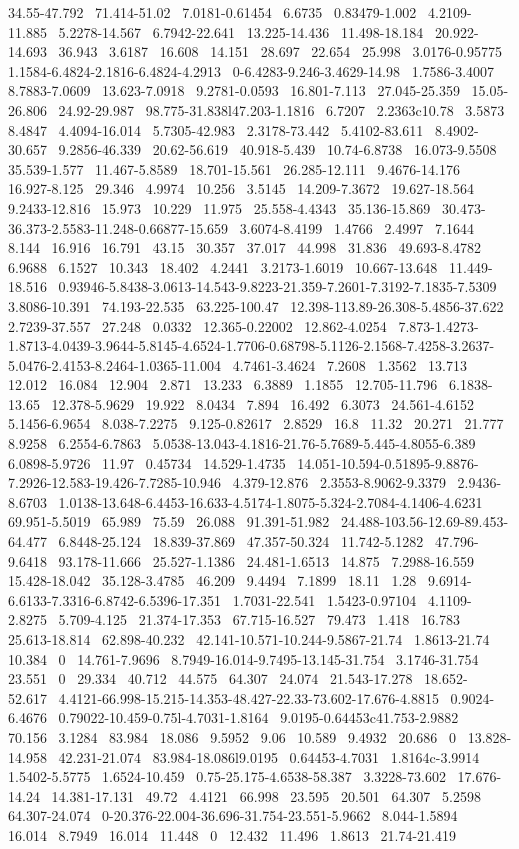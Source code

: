 \documentclass{article}
\begin{document}
34.55-47.792~ 71.414-51.02~ 7.0181-0.61454~ 6.6735~ 0.83479-1.002~ 4.2109-11.885~ 5.2278-14.567~ 6.7942-22.641~ 13.225-14.436~ 11.498-18.184~ 20.922-14.693~ 36.943~ 3.6187~ 16.608~ 14.151~ 28.697~ 22.654~ 25.998~ 3.0176-0.95775~ 1.1584-6.4824-2.1816-6.4824-4.2913~ 0-6.4283-9.246-3.4629-14.98~ 1.7586-3.4007~ 8.7883-7.0609~ 13.623-7.0918~ 9.2781-0.0593~ 16.801-7.113~ 27.045-25.359~ 15.05-26.806~ 24.92-29.987~ 98.775-31.838l47.203-1.1816~ 6.7207~ 2.2363c10.78~ 3.5873~ 8.4847~ 4.4094-16.014~ 5.7305-42.983~ 2.3178-73.442~ 5.4102-83.611~ 8.4902-30.657~ 9.2856-46.339~ 20.62-56.619~ 40.918-5.439~ 10.74-6.8738~ 16.073-9.5508~ 35.539-1.577~ 11.467-5.8589~ 18.701-15.561~ 26.285-12.111~ 9.4676-14.176~ 16.927-8.125~ 29.346~ 4.9974~ 10.256~ 3.5145~ 14.209-7.3672~ 19.627-18.564~ 9.2433-12.816~ 15.973~ 10.229~ 11.975~ 25.558-4.4343~ 35.136-15.869~ 30.473-36.373-2.5583-11.248-0.66877-15.659~ 3.6074-8.4199~ 1.4766~ 2.4997~ 7.1644~ 8.144~ 16.916~ 16.791~ 43.15~ 30.357~ 37.017~ 44.998~ 31.836~ 49.693-8.4782~ 6.9688~ 6.1527~ 10.343~ 18.402~ 4.2441~ 3.2173-1.6019~ 10.667-13.648~ 11.449-18.516~ 0.93946-5.8438-3.0613-14.543-9.8223-21.359-7.2601-7.3192-7.1835-7.5309~ 3.8086-10.391~ 74.193-22.535~ 63.225-100.47~ 12.398-113.89-26.308-5.4856-37.622~ 2.7239-37.557~ 27.248~ 0.0332~ 12.365-0.22002~ 12.862-4.0254~ 7.873-1.4273-1.8713-4.0439-3.9644-5.8145-4.6524-1.7706-0.68798-5.1126-2.1568-7.4258-3.2637-5.0476-2.4153-8.2464-1.0365-11.004~ 4.7461-3.4624~ 7.2608~ 1.3562~ 13.713~ 12.012~ 16.084~ 12.904~ 2.871~ 13.233~ 6.3889~ 1.1855~ 12.705-11.796~ 6.1838-13.65~ 12.378-5.9629~ 19.922~ 8.0434~ 7.894~ 16.492~ 6.3073~ 24.561-4.6152~ 5.1456-6.9654~ 8.038-7.2275~ 9.125-0.82617~ 2.8529~ 16.8~ 11.32~ 20.271~ 21.777~ 8.9258~ 6.2554-6.7863~ 5.0538-13.043-4.1816-21.76-5.7689-5.445-4.8055-6.389~ 6.0898-5.9726~ 11.97~ 0.45734~ 14.529-1.4735~ 14.051-10.594-0.51895-9.8876-7.2926-12.583-19.426-7.7285-10.946~ 4.379-12.876~ 2.3553-8.9062-9.3379~ 2.9436-8.6703~ 1.0138-13.648-6.4453-16.633-4.5174-1.8075-5.324-2.7084-4.1406-4.6231~ 69.951-5.5019~ 65.989~ 75.59~ 26.088~ 91.391-51.982~ 24.488-103.56-12.69-89.453-64.477~ 6.8448-25.124~ 18.839-37.869~ 47.357-50.324~ 11.742-5.1282~ 47.796-9.6418~ 93.178-11.666~ 25.527-1.1386~ 24.481-1.6513~ 14.875~ 7.2988-16.559~ 15.428-18.042~ 35.128-3.4785~ 46.209~ 9.4494~ 7.1899~ 18.11~ 1.28~ 9.6914-6.6133-7.3316-6.8742-6.5396-17.351~ 1.7031-22.541~ 1.5423-0.97104~ 4.1109-2.8275~ 5.709-4.125~ 21.374-17.353~ 67.715-16.527~ 79.473~ 1.418~ 16.783~ 25.613-18.814~ 62.898-40.232~ 42.141-10.571-10.244-9.5867-21.74~ 1.8613-21.74~ 10.384~ 0~ 14.761-7.9696~ 8.7949-16.014-9.7495-13.145-31.754~ 3.1746-31.754~ 23.551~ 0~ 29.334~ 40.712~ 44.575~ 64.307~ 24.074~ 21.543-17.278~ 18.652-52.617~ 4.4121-66.998-15.215-14.353-48.427-22.33-73.602-17.676-4.8815~ 0.9024-6.4676~ 0.79022-10.459-0.75l-4.7031-1.8164~ 9.0195-0.64453c41.753-2.9882~ 70.156~ 3.1284~ 83.984~ 18.086~ 9.5952~ 9.06~ 10.589~ 9.4932~ 20.686~ 0~ 13.828-14.958~ 42.231-21.074~ 83.984-18.086l9.0195~ 0.64453-4.7031~ 1.8164c-3.9914~ 1.5402-5.5775~ 1.6524-10.459~ 0.75-25.175-4.6538-58.387~ 3.3228-73.602~ 17.676-14.24~ 14.381-17.131~ 49.72~ 4.4121~ 66.998~ 23.595~ 20.501~ 64.307~ 5.2598~ 64.307-24.074~ 0-20.376-22.004-36.696-31.754-23.551-5.9662~ 8.044-1.5894~ 16.014~ 8.7949~ 16.014~ 11.448~ 0~ 12.432~ 11.496~ 1.8613~ 21.74-21.419~ 
\end{document}
